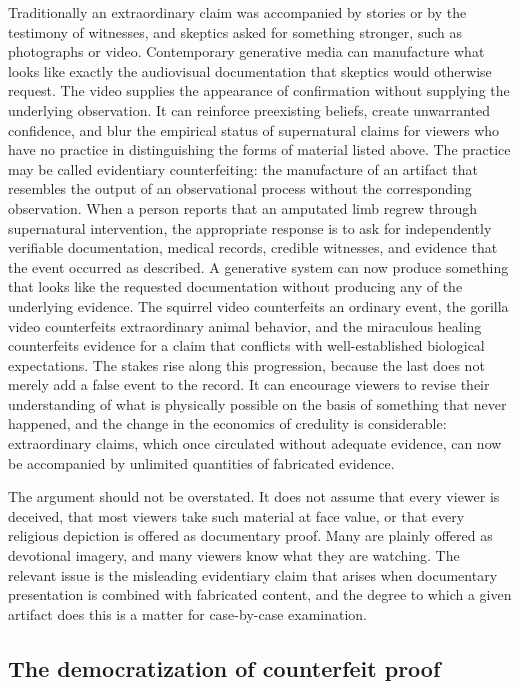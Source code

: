 \documentclass[12pt]{article}
\theoremstyle{plain}
\theoremstyle{definition}
\theoremstyle{remark}
\begin{document}
Traditionally an extraordinary claim was accompanied by stories or by the testimony of witnesses, and skeptics asked for something stronger, such as photographs or video. Contemporary generative media can manufacture what looks like exactly the audiovisual documentation that skeptics would otherwise request. The video supplies the appearance of confirmation without supplying the underlying observation. It can reinforce preexisting beliefs, create unwarranted confidence, and blur the empirical status of supernatural claims for viewers who have no practice in distinguishing the forms of material listed above. The practice may be called evidentiary counterfeiting: the manufacture of an artifact that resembles the output of an observational process without the corresponding observation. When a person reports that an amputated limb regrew through supernatural intervention, the appropriate response is to ask for independently verifiable documentation, medical records, credible witnesses, and evidence that the event occurred as described. A generative system can now produce something that looks like the requested documentation without producing any of the underlying evidence. The squirrel video counterfeits an ordinary event, the gorilla video counterfeits extraordinary animal behavior, and the miraculous healing counterfeits evidence for a claim that conflicts with well-established biological expectations. The stakes rise along this progression, because the last does not merely add a false event to the record. It can encourage viewers to revise their understanding of what is physically possible on the basis of something that never happened, and the change in the economics of credulity is considerable: extraordinary claims, which once circulated without adequate evidence, can now be accompanied by unlimited quantities of fabricated evidence.

The argument should not be overstated. It does not assume that every viewer is deceived, that most viewers take such material at face value, or that every religious depiction is offered as documentary proof. Many are plainly offered as devotional imagery, and many viewers know what they are watching. The relevant issue is the misleading evidentiary claim that arises when documentary presentation is combined with fabricated content, and the degree to which a given artifact does this is a matter for case-by-case examination.

\subsection{The democratization of counterfeit proof}
\end{document}
